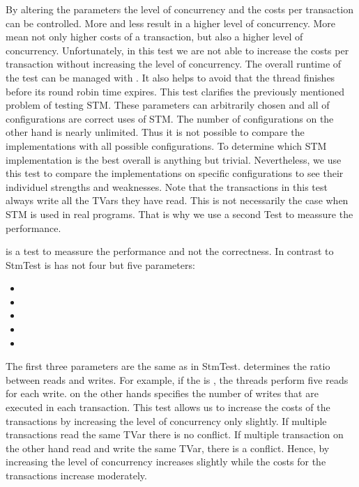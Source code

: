 By altering the parameters the level of concurrency and the costs per transaction can be controlled. More  and less 
 result in a higher level of concurrency. More  mean not only higher costs of a transaction, but also
a higher level of concurrency. Unfortunately, in this test we are not able to increase the costs per transaction without increasing
the level of concurrency. The overall runtime of the test can be managed with . It also helps to avoid that the thread
finishes before its round robin time expires. This test clarifies the previously mentioned problem of testing STM. These parameters can 
arbitrarily chosen and all of configurations are correct uses of STM. The number of configurations on the other hand is nearly unlimited. Thus 
it is not possible to compare the implementations with all possible configurations. To determine which STM implementation is the best overall 
is anything but trivial.
Nevertheless, we use this test to compare the implementations on specific configurations to see their individuel strengths and weaknesses.
Note that the transactions in this test always write all the TVars they have read. This is not necessarily the case when STM is used in real programs. 
That is why we use a second Test to meassure the performance.

 is a test to meassure the performance and not the correctness. In contrast to StmTest is has not four but
five parameters:
\begin{itemize}
 \item {}
 \item {}
 \item {}
 \item {}
 \item {}
\end{itemize}
The first three parameters are the same as in StmTest.  determines the ratio between reads and writes. For example, if
the  is , the threads perform five reads for each write.  on the other hands specifies
the number of writes that are executed in each transaction. This test allows us to increase the costs of the transactions by 
increasing the level of concurrency only slightly. If multiple transactions read the same TVar there is no conflict. If multiple
transaction on the other hand read and write the same TVar, there is a conflict. Hence, by increasing  the level of 
concurrency increases slightly while the costs for the transactions increase moderately.

